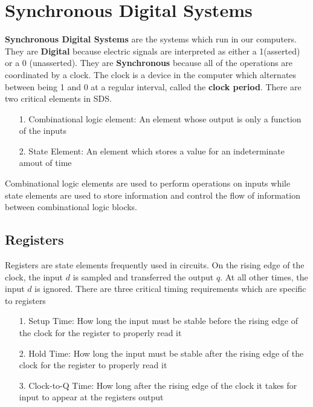 \documentclass{article}
\begin{document}
\section{Synchronous Digital Systems}
\textbf{Synchronous Digital Systems} are the systems which run in our computers. They are \textbf{Digital} because electric signals are interpreted
as either a 1(asserted) or a 0 (unasserted).
They are \textbf{Synchronous} because all of the operations are coordinated by a clock. The clock is a device in the computer
which alternates between being 1 and 0 at a regular interval, called the \textbf{clock period}. There are two critical elements in SDS.
\begin{itemize}
    \item[1.]Combinational logic element: An element whose output is only a function of the inputs
    \item[2.]State Element: An element which stores a value for an indeterminate amout of time
\end{itemize}
Combinational logic elements are used to perform operations on inputs while state elements are used to store information
and control the flow of information between combinational logic blocks.
\subsection{Registers}
Registers are state elements frequently used in circuits. On the rising edge of the clock, the input $d$ is sampled
and transferred the output $q$. At all other times, the input $d$ is ignored. There are three critical timing requirements
which are specific to registers
\begin{itemize}
    \item[1.]Setup Time: How long the input must be stable before the rising edge of the clock for the register to properly read it
    \item[2.]Hold Time: How long the input must be stable after the rising edge of the clock for the register to properly read it
    \item[3.]Clock-to-Q Time: How long after the rising edge of the clock it takes for input to appear at the registers output  
\end{itemize}
\end{document}
